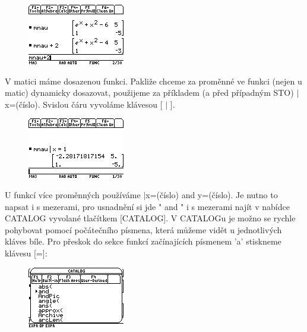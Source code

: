 \documentclass[10pt,a4paper,float]{article}
\begin{document}
\begin{figure}[H]
	\centering
	\includegraphics[width=.5\textwidth]{img/UZITIMATIC1}
\end{figure}

V matici máme dosazenou funkci. Pakliže chceme za proměnné ve funkci (nejen u matic) dynamicky dosazovat, použijeme za příkladem (a před případným STO) $\vert$x=(číslo). Svislou čáru vyvoláme klávesou [ $\vert$ ].

\begin{figure}[H]
	\centering
	\includegraphics[width=.5\textwidth]{img/UZITIMATIC2}
\end{figure}

\pagebreak

U funkcí více proměnných používáme $\vert$x=(číslo) and y=(číslo). Je nutno to napsat i s mezerami, pro usnadnění si jde " and " i s mezerami najít v nabídce CATALOG vyvolané tlačítkem [CATALOG]. V CATALOGu je možno se rychle pohybovat pomocí počátečního písmena, která můžeme vidět u jednotlivých kláves bíle. Pro přeskok do sekce funkcí začínajících písmenem 'a' stiskneme klávesu [=]:

\begin{figure}[H]
	\centering
	\includegraphics[width=.5\textwidth]{img/CATALOG}
\end{figure}
\end{document}
